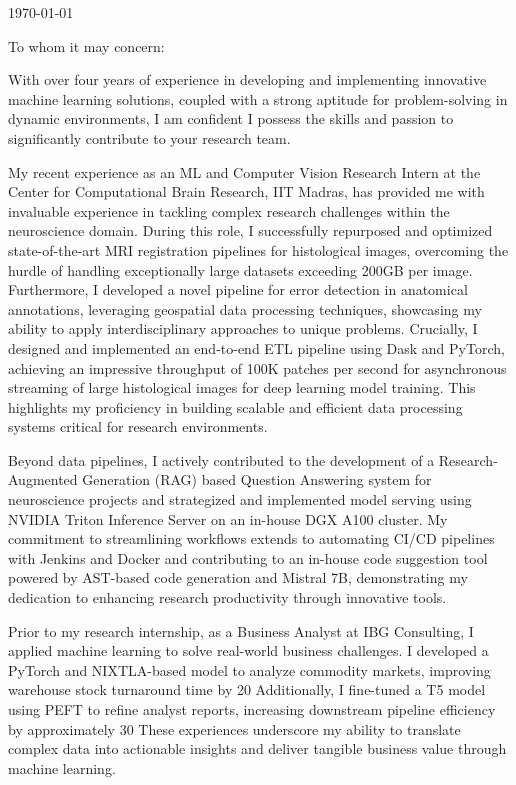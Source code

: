 \documentclass{ExpressiveCoverLetter}
\begin{document}
\coverletterheader[
	firstname=Risan Raja,
	middleinitial=,
	lastname=,
	email=risan.raja@icloud.com,
	phone=+91-963-332-6718,
	linkedin=risanraja,
	github=risan-raja,
]

\vspace{0.25in}
\today
\vspace{0.15in}


To whom it may concern:

With over four years of experience in developing and implementing innovative machine learning solutions, coupled with a strong aptitude for problem-solving in dynamic environments, I am confident I possess the skills and passion to significantly contribute to your research team.

My recent experience as an ML and Computer Vision Research Intern at the Center for Computational Brain Research, IIT Madras, has provided me with invaluable experience in tackling complex research challenges within the neuroscience domain. During this role, I successfully repurposed and optimized state-of-the-art MRI registration pipelines for histological images, overcoming the hurdle of handling exceptionally large datasets exceeding 200GB per image. Furthermore, I developed a novel pipeline for error detection in anatomical annotations, leveraging geospatial data processing techniques, showcasing my ability to apply interdisciplinary approaches to unique problems. Crucially, I designed and implemented an end-to-end ETL pipeline using Dask and PyTorch, achieving an impressive throughput of 100K patches per second for asynchronous streaming of large histological images for deep learning model training. This highlights my proficiency in building scalable and efficient data processing systems critical for research environments.

Beyond data pipelines, I actively contributed to the development of a 
Research-Augmented Generation (RAG) based Question Answering system for
 neuroscience projects and strategized and implemented model serving 
 using NVIDIA Triton Inference Server on an in-house DGX A100 cluster. 
My commitment to streamlining workflows extends to automating CI/CD
pipelines with Jenkins and Docker and contributing to an in-house code 
suggestion tool powered by AST-based code generation and Mistral 7B, 
demonstrating my dedication to enhancing research productivity through 
innovative tools.

Prior to my research internship, as a Business Analyst at IBG
Consulting, I applied machine learning to solve real-world business
challenges. I developed a PyTorch and NIXTLA-based model to analyze
commodity markets, improving warehouse stock turnaround time by 20%
Additionally, I fine-tuned a T5 model using PEFT to refine analyst 
reports, increasing downstream pipeline efficiency by approximately
30%
These experiences underscore my ability to translate complex data into 
actionable insights and deliver tangible business value through machine 
learning.
\end{document}
